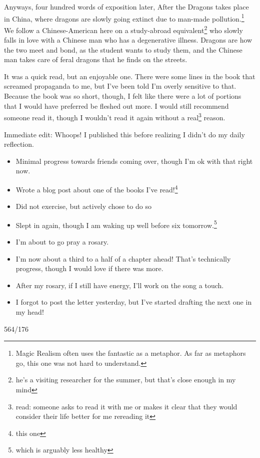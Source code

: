 \documentclass[12pt]{article}[titlepage]
\newcommand{\1}{\={a}}
\newcommand{\2}{\={e}}
\newcommand{\3}{\={\i}}
\newcommand{\4}{\=o}
\newcommand{\5}{\=u}
\newcommand{\6}{\={A}}
\renewcommand{\,}{\textsuperscript{,}}
\begin{document}
Anyways, four hundred words of exposition later, After the Dragons takes place in China, where dragons are slowly going extinct due to man-made pollution.\footnote{Magic Realism often uses the fantastic as a metaphor. As far as metaphors go, this one was not hard to understand.}
We follow a Chinese-American here on a study-abroad equivalent\footnote{he's a visiting researcher for the summer, but that's close enough in my mind} who slowly falls in love with a Chinese man who has a degenerative illness.
Dragons are how the two meet and bond, as the student wants to study them, and the Chinese man takes care of feral dragons that he finds on the streets.

It was a quick read, but an enjoyable one.
There were some lines in the book that screamed propaganda to me, but I've been told I'm overly sensitive to that.
Because the book was so short, though, I felt like there were a lot of portions that I would have preferred be fleshed out more.
I would still recommend someone read it, though I wouldn't read it again without a real\footnote{read: someone asks to read it with me or makes it clear that they would consider their life better for me rereading it} reason.

Immediate edit:
Whoops!
I published this before realizing I didn't do my daily reflection.

\begin{itemize}
\item Minimal progress towards friends coming over, though I'm ok with that right now.
\item Wrote a blog post about one of the books I've read!\footnote{this one}
\item Did not exercise, but actively chose to do so
\item Slept in again, though I am waking up well before six tomorrow.\footnote{which is arguably less healthy}
\item I'm about to go pray a rosary.
\item I'm now about a third to a half of a chapter ahead! That's technically progress, though I would love if there was more.
\item After my rosary, if I still have energy, I'll work on the song a touch.
\item I forgot to post the letter yesterday, but I've started drafting the next one in my head!
\end{itemize}

564/176
\end{document}
